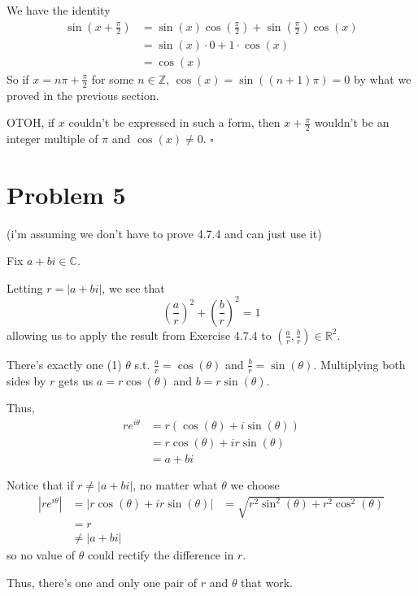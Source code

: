 \documentclass[12pt]{article}
\newcommand{\R}{\mathbb{R}}
\newcommand{\Z}{\mathbb{Z}}
\newcommand{\C}{\mathbb{C}}
\begin{document}
We have the identity
\begin{align*}
  \sin\left(x+\frac{\pi}{2}\right)
  &= \sin(x)\cos\left(\frac{\pi}{2}\right)+\sin\left(\frac{\pi}{2}\right)\cos(x) \\
  &= \sin(x) \cdot 0 + 1 \cdot \cos(x) \\
  &= \cos(x)
\end{align*}
So if $x=n\pi+\frac{\pi}{2}$ for some $n \in \Z$,
$\cos(x)=\sin((n+1)\pi)=0$ by what we proved in the previous section.

OTOH, if $x$ couldn't be expressed in such a form, then $x+\frac{\pi}{2}$
wouldn't be an integer multiple of $\pi$ and $\cos(x) \ne 0$. $\square$

\pagebreak

\setcounter{section}{4}

\section{Problem 5}

 (i'm assuming we don't have to prove 4.7.4 and can just use it)

Fix $a+bi \in \C$.

Letting $r=|a+bi|$, we see that
\[\left(\frac{a}{r}\right)^2+\left(\frac{b}{r}\right)^2=1\]
allowing us to apply the result from Exercise 4.7.4 to $\left(\frac{a}{r}, \frac{b}{r}\right) \in \R^2$.

There's exactly one (1) $\theta$ s.t. $\frac{a}{r}=\cos(\theta)$ and $\frac{b}{r}=\sin(\theta)$.
Multiplying both sides by $r$ gets us $a=r\cos(\theta)$ and $b=r\sin(\theta)$.

Thus,
\begin{align*}
  re^{i\theta}
   & = r(\cos(\theta)+i\sin(\theta)) \\
   & = r\cos(\theta)+ir\sin(\theta)  \\
   & = a+bi
\end{align*}

Notice that if $r \ne |a+bi|$, no matter what $\theta$ we choose
\begin{align*}
  \left|re^{i\theta}\right|
   & = \left|r\cos(\theta)+ir\sin(\theta)\right|
   & = \sqrt{r^2\sin^2(\theta)+r^2\cos^2(\theta)} \\
   & = r                                          \\
   & \ne |a+bi|
\end{align*}
so no value of $\theta$ could rectify the difference in $r$.

Thus, there's one and only one pair of $r$ and $\theta$ that work.
\end{document}
